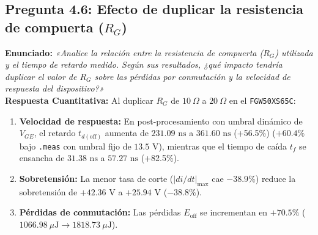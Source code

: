 \documentclass[11pt,a4paper]{article}
\begin{document}
\subsection{Pregunta 4.6: Efecto de duplicar la resistencia de compuerta ($R_G$)}
\textbf{Enunciado:} \textit{«Analice la relación entre la resistencia de compuerta ($R_G$) utilizada y el tiempo de retardo medido. Según sus resultados, ¿qué impacto tendría duplicar el valor de $R_G$ sobre las pérdidas por conmutación y la velocidad de respuesta del dispositivo?»}\\
\textbf{Respuesta Cuantitativa:} Al duplicar $R_G$ de $10\ \Omega$ a $20\ \Omega$ en el \texttt{FGW50XS65C}:
\begin{enumerate}[leftmargin=*, noitemsep, topsep=2pt]
  \item \textbf{Velocidad de respuesta:} En post-procesamiento con umbral dinámico de $V_{GE}$, el retardo $t_{d(\text{off})}$ aumenta de $231.09\text{ ns}$ a $361.60\text{ ns}$ (+56.5\%) ($+60.4\%$ bajo \texttt{.meas} con umbral fijo de $13.5\text{ V}$), mientras que el tiempo de caída $t_f$ se ensancha de $31.38\text{ ns}$ a $57.27\text{ ns}$ (+82.5\%).
  \item \textbf{Sobretensión:} La menor tasa de corte ($|di/dt|_{\text{max}}$ cae $-38.9\%$) reduce la sobretensión de $+42.36\text{ V}$ a $+25.94\text{ V}$ ($-38.8\%$).
  \item \textbf{Pérdidas de conmutación:} Las pérdidas $E_{\text{off}}$ se incrementan en $+70.5\%$ ($1066.98\ \mu\text{J} \to 1818.73\ \mu\text{J}$).
\end{enumerate}

\vspace{-2pt}
\end{document}
